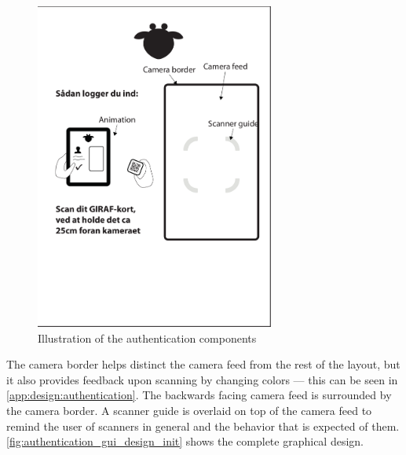 \begin{figure}[!h]
	\centering
	\includegraphics[width=0.7\textwidth]{gfx/authentication_bw_gui.pdf}
	\caption{Illustration of the authentication components}
	\label{fig:authentication_gui_illustration}
\end{figure}

The camera border helps distinct the camera feed from the rest of the layout, but it also provides feedback upon scanning by changing colors --- this can be seen in \autoref{app:design:authentication}. 
The backwards facing camera feed is surrounded by the camera border. 
A scanner guide is overlaid on top of the camera feed to remind the user of scanners in general and the behavior that is expected of them.
\autoref{fig:authentication_gui_design_init} shows the complete graphical design.

